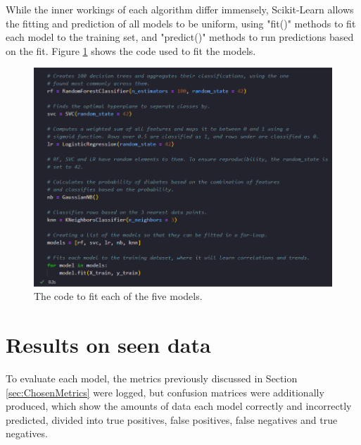 \documentclass[12pt]{report}
\newcommand{\para}{\vspace{8pt}\noindent}
\begin{document}
\para While the inner workings of each algorithm differ immensely, Scikit-Learn allows the fitting and prediction of 
all models to be uniform, using "fit()" methods to fit each model to the training set, and "predict()" methods to run 
predictions based on the fit. Figure \ref{fig:ModelFitting} shows the code used to fit the models.

\begin{figure}[H]
    \centering 
    \includegraphics[width=\linewidth]{ModelDev/Iteration1/Code/Fitting.png}
    \caption{The code to fit each of the five models.}
    \label{fig:ModelFitting}
\end{figure}


\pagebreak
\section{Results on seen data}

To evaluate each model, the metrics previously discussed in Section \ref{sec:ChosenMetrics} 
were logged, but confusion matrices were additionally produced, which show the amounts of data
each model correctly and incorrectly predicted, divided into true positives, false positives, 
false negatives and true negatives.
\end{document}
